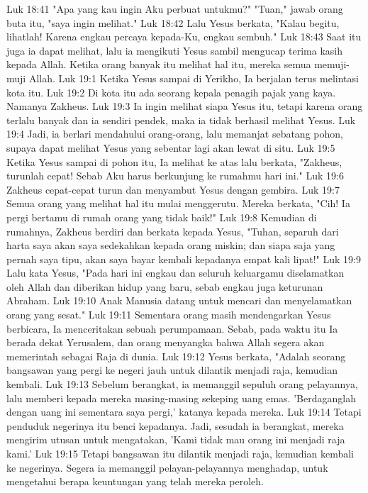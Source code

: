 Luk 18:41  "Apa yang kau ingin Aku perbuat untukmu?" "Tuan," jawab orang buta itu, "saya ingin melihat."
Luk 18:42  Lalu Yesus berkata, "Kalau begitu, lihatlah! Karena engkau percaya kepada-Ku, engkau sembuh."
Luk 18:43  Saat itu juga ia dapat melihat, lalu ia mengikuti Yesus sambil mengucap terima kasih kepada Allah. Ketika orang banyak itu melihat hal itu, mereka semua memuji-muji Allah.
Luk 19:1  Ketika Yesus sampai di Yerikho, Ia berjalan terus melintasi kota itu.
Luk 19:2  Di kota itu ada seorang kepala penagih pajak yang kaya. Namanya Zakheus.
Luk 19:3  Ia ingin melihat siapa Yesus itu, tetapi karena orang terlalu banyak dan ia sendiri pendek, maka ia tidak berhasil melihat Yesus.
Luk 19:4  Jadi, ia berlari mendahului orang-orang, lalu memanjat sebatang pohon, supaya dapat melihat Yesus yang sebentar lagi akan lewat di situ.
Luk 19:5  Ketika Yesus sampai di pohon itu, Ia melihat ke atas lalu berkata, "Zakheus, turunlah cepat! Sebab Aku harus berkunjung ke rumahmu hari ini."
Luk 19:6  Zakheus cepat-cepat turun dan menyambut Yesus dengan gembira.
Luk 19:7  Semua orang yang melihat hal itu mulai menggerutu. Mereka berkata, "Cih! Ia pergi bertamu di rumah orang yang tidak baik!"
Luk 19:8  Kemudian di rumahnya, Zakheus berdiri dan berkata kepada Yesus, "Tuhan, separuh dari harta saya akan saya sedekahkan kepada orang miskin; dan siapa saja yang pernah saya tipu, akan saya bayar kembali kepadanya empat kali lipat!"
Luk 19:9  Lalu kata Yesus, "Pada hari ini engkau dan seluruh keluargamu diselamatkan oleh Allah dan diberikan hidup yang baru, sebab engkau juga keturunan Abraham.
Luk 19:10  Anak Manusia datang untuk mencari dan menyelamatkan orang yang sesat."
Luk 19:11  Sementara orang masih mendengarkan Yesus berbicara, Ia menceritakan sebuah perumpamaan. Sebab, pada waktu itu Ia berada dekat Yerusalem, dan orang menyangka bahwa Allah segera akan memerintah sebagai Raja di dunia.
Luk 19:12  Yesus berkata, "Adalah seorang bangsawan yang pergi ke negeri jauh untuk dilantik menjadi raja, kemudian kembali.
Luk 19:13  Sebelum berangkat, ia memanggil sepuluh orang pelayannya, lalu memberi kepada mereka masing-masing sekeping uang emas. 'Berdaganglah dengan uang ini sementara saya pergi,' katanya kepada mereka.
Luk 19:14  Tetapi penduduk negerinya itu benci kepadanya. Jadi, sesudah ia berangkat, mereka mengirim utusan untuk mengatakan, 'Kami tidak mau orang ini menjadi raja kami.'
Luk 19:15  Tetapi bangsawan itu dilantik menjadi raja, kemudian kembali ke negerinya. Segera ia memanggil pelayan-pelayannya menghadap, untuk mengetahui berapa keuntungan yang telah mereka peroleh.
